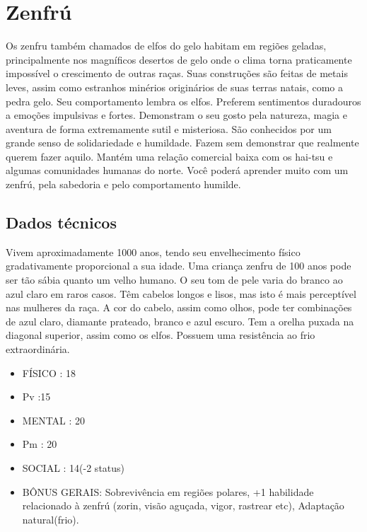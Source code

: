 \section{Zenfrú}

Os zenfru também chamados de elfos do gelo habitam em regiões geladas, principalmente nos magníficos desertos de gelo onde o clima torna praticamente impossível o crescimento de outras raças. Suas construções são feitas de metais leves, assim como estranhos minérios originários de suas terras natais, como a pedra gelo. Seu comportamento lembra os elfos. Preferem sentimentos duradouros a emoções impulsivas e fortes. Demonstram o seu gosto pela natureza, magia e aventura de forma extremamente sutil e misteriosa. São conhecidos por um grande senso de solidariedade e humildade. Fazem sem demonstrar que realmente querem fazer aquilo. Mantém uma relação comercial baixa com os hai-tsu e algumas comunidades humanas do norte.
Você poderá aprender muito com um zenfrú, pela sabedoria e pelo comportamento humilde.

\subsection{Dados técnicos}

Vivem aproximadamente 1000 anos, tendo seu envelhecimento físico gradativamente proporcional a sua idade. Uma criança zenfru de 100 anos pode ser tão sábia quanto um velho humano. O seu tom de pele varia do branco ao azul claro em raros casos. Têm cabelos longos e lisos, mas isto é mais perceptível nas mulheres da raça. A cor do cabelo, assim como olhos, pode ter combinações de azul claro, diamante prateado, branco e azul escuro. Tem a orelha puxada na diagonal superior, assim como os elfos. Possuem uma resistência ao frio extraordinária.

\begin{itemize}
	\item FÍSICO : 18
	\item Pv :15 

	\item MENTAL : 20
	\item Pm : 20

	\item SOCIAL : 14(-2 status)

	\item BÔNUS GERAIS: Sobrevivência em regiões polares, +1 habilidade relacionado à zenfrú (zorin, visão aguçada, vigor, rastrear etc), Adaptação natural(frio).
\end{itemize}


